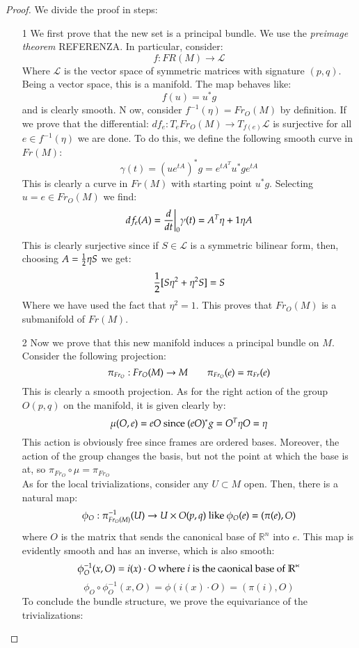 \documentclass[12pt,a4paper]{report}
\theoremstyle{definition}
\theoremstyle{Theorem}
\theoremstyle{break}
\theoremstyle{definition}
\begin{document}
		\begin{proof}
			We divide the proof in steps:
			\begin{itemize}
				\item [1] We first prove that the new set is a principal bundle. We use the \textit{preimage theorem} REFERENZA. In particular, consider:
				$$f:FR(M)\rightarrow \mathcal{L}$$
				Where $\mathcal{L}$ is the vector space of symmetric matrices with signature $(p,q)$. Being a vector space, this is a manifold. The map behaves like:
				$$f(u)=u^*g$$
				and is clearly smooth. N
				ow, consider $f^{-1}(\eta)=Fr_O(M)$ by definition. If we prove that the differential:
				$df_e:T_eFr_O(M)\rightarrow T_{f(e)}\mathcal{L}$ is surjective for all $e\in f^{-1}(\eta)$ we are done.
				To do this, we define the following smooth curve in $Fr(M)$:
				$$\gamma(t)=(ue^{tA})^*g=e^{tA^T}u^*ge^{tA}$$
				This is clearly a curve in $Fr(M)$ with starting point $u^*g$. Selecting $u=e\in Fr_O(M)$ we find:
				$$df_e(A)={d\over dt}\bigg|_0 \gamma(t)=A^T\eta+1\eta A$$
				This is clearly surjective since if $S\in\mathcal{L}$ is a symmetric bilinear form, then, choosing $A={1\over 2}\eta S$ we get:
				$${1\over 2}[S\eta^2+\eta^2S]=S$$
				Where we have used the fact that $\eta^2=1$. This proves that $Fr_O(M)$ is a submanifold of $Fr(M)$.
				\item [2] Now we prove that this new manifold induces a principal bundle on $M$. Consider the following projection:
				$$\pi_{Fr_O}:Fr_O(M)\rightarrow M\hspace{20 pt}\pi_{Fr_O}(e)=\pi_{Fr}(e)$$
				This is clearly a smooth projection. As for the right action of the group $O(p,q)$ on the manifold, it is given clearly by:
				$$\mu(O,e)=eO\hbox{ since }(eO)^*g=O^T\eta O=\eta$$
				This action is obviously free since frames are ordered bases. Moreover, the action of the group changes the basis, but not the point at which the base is at, so $\pi_{Fr_O}\circ \mu=\pi_{Fr_O}$\\
				As for the local trivializations, consider any $U\subset M$ open. Then, there is a natural map:
				$$\phi_O:\pi_{Fr_O(M)}^{-1}(U)\rightarrow U\times O(p,q) \hbox{ like }\phi_O(e)=(\pi(e),O)$$
				where $O$ is the matrix that sends the canonical base of $\mathbb{R}^n$ into $e$. This map is evidently smooth and has an inverse, which is also smooth:
				$$\phi_O^{-1}(x,O)=i(x)\cdot O\hbox{ where } i \hbox{ is the caonical base of }\mathbb{R^n}$$
				$$\phi_O\circ \phi_O^{-1}(x,O)=\phi(i(x)\cdot O)=(\pi(i),O)$$
				To conclude the bundle structure, we prove the equivariance of the trivializations:

\end{itemize}
\end{proof}
\end{document}
